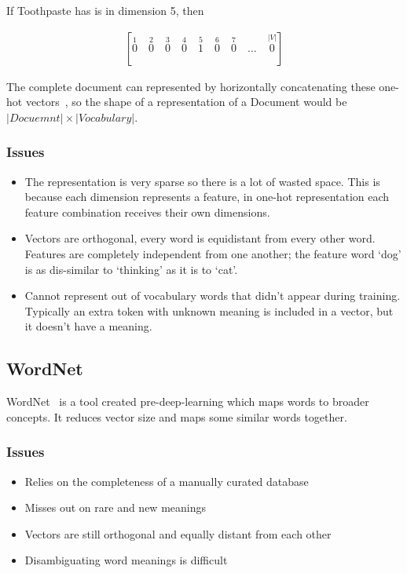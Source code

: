 \documentclass[11pt]{article}
\begin{document}
If Toothpaste has is in dimension 5, then

\begin{align*}
    \left[\stackrel{1}{0} \quad \stackrel{2}{0} \quad \stackrel{3}{0} \quad \stackrel{4}{0} \quad \stackrel{5}{1} \quad \stackrel{6}{0} \quad \stackrel{7}{0} \quad \ldots \quad \stackrel{|V|}{0}  \right]
\end{align*}

The complete document can represented by horizontally concatenating these one-hot vectors~\cite{git-natural-language-processing}, so the shape of a representation of a Document would be $|Docuemnt| \times |Vocabulary|$.

\subsubsection{Issues}

\begin{itemize}
    \item The representation is very sparse so there is a lot of wasted space. This is because each dimension represents a feature, in one-hot representation each feature combination receives their own dimensions.

    \item Vectors are orthogonal, every word is equidistant from every other word. Features are completely independent from one another; the feature word `dog' is as dis-similar to `thinking' as it is to `cat'.
    
    \item Cannot represent out of vocabulary words that didn't appear during training. Typically an extra token with unknown meaning is included in a vector, but it doesn't have a meaning.
\end{itemize}

\subsection{WordNet}

WordNet~\cite{wordnet-how-to} is a tool created pre-deep-learning which maps words to broader concepts. It reduces vector size and maps some similar words together.

\subsubsection{Issues}

\begin{itemize}
    \item Relies on the completeness of a manually curated database
    \item Misses out on rare and new meanings
    \item Vectors are still orthogonal and equally distant from each other
    \item Disambiguating word meanings is difficult
\end{itemize}
\end{document}
